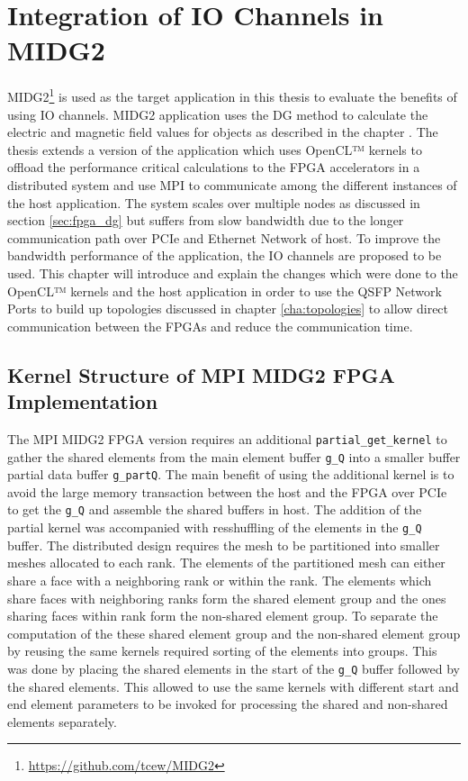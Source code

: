 \chapter{Integration of IO Channels in MIDG2}
\label{cha:sys_arch}

MIDG2\footnote{\url{https://github.com/tcew/MIDG2}} is used as the target
application in this thesis to evaluate the benefits of using IO channels.
MIDG2 application uses the \ac{DG} method to calculate the electric and magnetic
field values for objects as described in the chapter .
The thesis extends a version of the application which uses OpenCL™ kernels to
offload the performance critical calculations to the FPGA accelerators in a
distributed system and use MPI to communicate among the different instances of the
host application. The system scales over multiple nodes as discussed in section
\ref{sec:fpga_dg} but suffers from slow bandwidth due to the longer communication
path over PCIe and Ethernet Network of host. To improve the bandwidth performance
of the application, the IO channels are proposed to be used. This chapter will
introduce and explain the changes which were done to the OpenCL™ kernels and the
host application in order to use the QSFP Network Ports to build up topologies discussed
in chapter \ref{cha:topologies} to allow direct communication between the FPGAs
and reduce the communication time.

\section{Kernel Structure of MPI MIDG2 FPGA Implementation}
\label{sec:midge_mpi}

The MPI MIDG2 FPGA version requires an additional \texttt{partial\_get\_kernel} to gather the shared elements from
the main element buffer \texttt{g\_Q} into a smaller buffer partial data buffer \texttt{g\_partQ}.
The main benefit of using the additional kernel is to avoid the large memory transaction between the
host and the FPGA over PCIe to get the \texttt{g\_Q} and assemble the shared buffers in host.
The addition of the partial kernel was accompanied with resshuffling of the elements in the \texttt{g\_Q}
buffer. The distributed design requires the mesh to be partitioned into smaller meshes allocated
to each rank. The elements of the partitioned mesh can either share a face with a neighboring
rank or within the rank. The elements which share faces with neighboring ranks form the shared
element group and the ones sharing faces within rank form the non-shared element group.
To separate the computation of the these shared element group and the non-shared element group
by reusing the same kernels required sorting of the elements into groups. This was done by
placing the shared elements in the start of the \texttt{g\_Q} buffer followed by the shared
elements. This allowed to use the same kernels with different start and end element parameters
to be invoked for processing the shared and non-shared elements separately.


